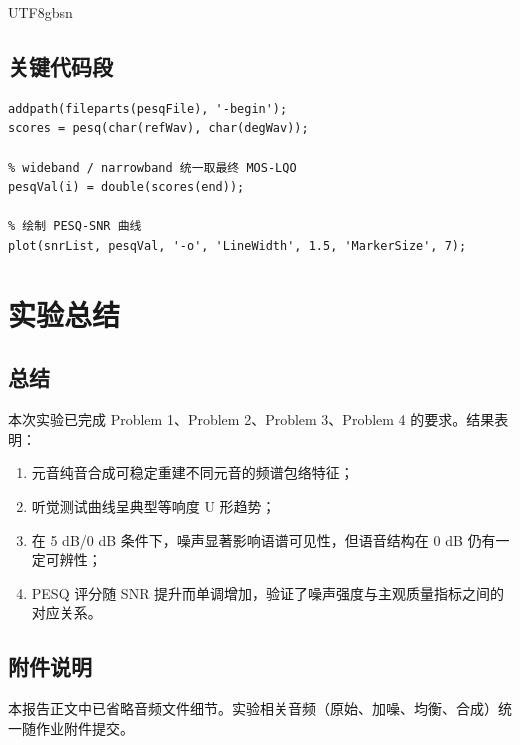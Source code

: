 \documentclass[12pt,a4paper]{article}
\begin{document}
\begin{CJK*}{UTF8}{gbsn}
\subsection{关键代码段}
\begin{lstlisting}[caption={Problem 4 PESQ 计算与曲线绘制}]
% 使用本地 pesq.m
addpath(fileparts(pesqFile), '-begin');
scores = pesq(char(refWav), char(degWav));

% wideband / narrowband 统一取最终 MOS-LQO
pesqVal(i) = double(scores(end));

% 绘制 PESQ-SNR 曲线
plot(snrList, pesqVal, '-o', 'LineWidth', 1.5, 'MarkerSize', 7);
\end{lstlisting}

\section{实验总结}
\subsection{总结}
本次实验已完成 Problem 1、Problem 2、Problem 3、Problem 4 的要求。结果表明：
\begin{enumerate}
    \item 元音纯音合成可稳定重建不同元音的频谱包络特征；
    \item 听觉测试曲线呈典型等响度 U 形趋势；
    \item 在 5 dB/0 dB 条件下，噪声显著影响语谱可见性，但语音结构在 0 dB 仍有一定可辨性；
    \item PESQ 评分随 SNR 提升而单调增加，验证了噪声强度与主观质量指标之间的对应关系。
\end{enumerate}

\subsection{附件说明}
本报告正文中已省略音频文件细节。实验相关音频（原始、加噪、均衡、合成）统一随作业附件提交。

\ifPDFTeX\end{CJK*}\fi
\end{document}
